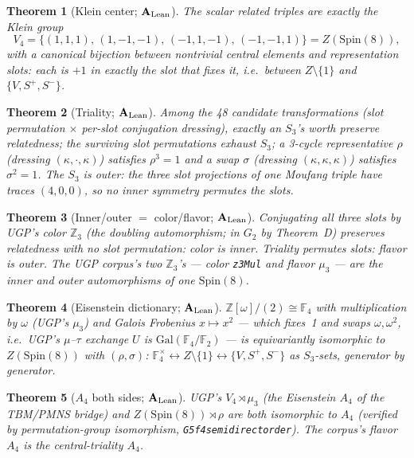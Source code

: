 \documentclass[11pt]{article}
\newtheorem{theorem}{Theorem}[section]
\theoremstyle{remark}
\newcommand{\lean}[1]{%
  \penalty-100
  \begingroup\def\_{\textunderscore\allowbreak}\texttt{#1}\endgroup}
\newcommand{\CatAL}{\ensuremath{\textbf{A}_{\rm Lean}}}
\begin{document}
\begin{theorem}[Klein center; \CatAL]
\label{thm:G1}
The scalar related triples are exactly the Klein group
\[
  V_4 = \{(1,1,1),\,(1,-1,-1),\,(-1,1,-1),\,(-1,-1,1)\} = Z(\mathrm{Spin}(8)),
\]
with a canonical bijection between nontrivial central elements and representation
slots: each is $+1$ in exactly the slot that fixes it,
\emph{i.e.}\ between $Z\setminus\{1\}$ and $\{V, S^+, S^-\}$.
\end{theorem}

\begin{theorem}[Triality; \CatAL]
\label{thm:G2}
Among the 48 candidate transformations (slot permutation $\times$ per-slot
conjugation dressing), exactly an $S_3$'s worth preserve relatedness; the
surviving slot permutations exhaust $S_3$; a 3-cycle representative $\rho$
(dressing $(\kappa,\cdot,\kappa)$) satisfies $\rho^3 = 1$ and a swap $\sigma$
(dressing $(\kappa,\kappa,\kappa)$) satisfies $\sigma^2 = 1$.
The $S_3$ is \emph{outer}: the three slot projections of one Moufang triple
have traces $(4,0,0)$, so no inner symmetry permutes the slots.
\end{theorem}

\begin{theorem}[Inner/outer $=$ color/flavor; \CatAL]
\label{thm:G3}
Conjugating all three slots by UGP's color $\mathbb{Z}_3$ (the doubling
automorphism; in $G_2$ by Theorem~D) preserves relatedness with no slot
permutation: color is inner.
Triality permutes slots: flavor is outer.
\emph{The UGP corpus's two $\mathbb{Z}_3$'s --- color \lean{z3Mul} and
flavor $\mu_3$ --- are the inner and outer automorphisms of one
$\mathrm{Spin}(8)$.}
\end{theorem}

\begin{theorem}[Eisenstein dictionary; \CatAL]
\label{thm:G4}
$\mathbb{Z}[\omega]/(2)\cong\mathbb{F}_4$ with multiplication by $\omega$
(UGP's $\mu_3$) and Galois Frobenius $x\mapsto x^2$ --- which fixes~1 and
swaps $\omega, \omega^2$, \emph{i.e.}\ \emph{UGP's $\mu$--$\tau$ exchange $U$
is $\mathrm{Gal}(\mathbb{F}_4/\mathbb{F}_2)$} --- is equivariantly isomorphic
to $Z(\mathrm{Spin}(8))$ with $(\rho, \sigma)$:
$\mathbb{F}_4^\times \leftrightarrow Z\setminus\{1\} \leftrightarrow \{V, S^+, S^-\}$
as $S_3$-sets, generator by generator.
\end{theorem}

\begin{theorem}[$A_4$ both sides; \CatAL]
\label{thm:G5}
UGP's $V_4\!\rtimes\!\mu_3$ (the Eisenstein $A_4$ of the TBM/PMNS bridge)
and $Z(\mathrm{Spin}(8))\!\rtimes\!\rho$ are both isomorphic to $A_4$
(verified by permutation-group isomorphism, \lean{G5\_f4\_semidirect\_order}).
The corpus's flavor $A_4$ is the central-triality $A_4$.
\end{theorem}
\end{document}
